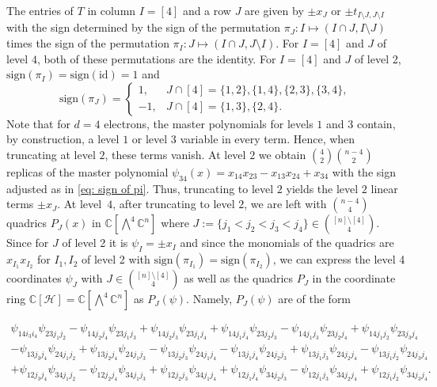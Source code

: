 \documentclass[11pt,reqno]{amsart}
\theoremstyle{definition}
\numberwithin{theorem}{section}
\newcommand{\sign}{\mathrm{sign}}
\numberwithin{equation}{section}
\begin{document}
The entries of $T$ in column $I=[4]$ and a row $J$ are given by $\pm x_J$ or $\pm t_{I \setminus J, J \setminus I}$ with the sign determined by
the sign of the permutation $\pi_J: I \mapsto (I \cap J, I \setminus J)$ times the sign of the permutation $\pi_I: J \mapsto (I \cap J, J \setminus I)$. 
For $I=[4]$ and $J$ of level $4$, both of these permutations are the identity.
For $I=[4]$ and $J$ of level 2, $\sign(\pi_I) = \sign (\text{id}) =1$ and 
\begin{equation}
\sign(\pi_J)= \left\{ \begin{array}{cl}
    1, & J \cap [4] = \{1,2\}, \{1,4\}, \{2,3\}, \{3,4\}, \\
    -1,  & J \cap [4] = \{1,3\}, \{2,4\}.
\end{array} \right.
\end{equation}\label{eq: sign of pi}
Note that for $d=4$ electrons, the master polynomials for levels $1$ and $3$ contain, by construction, a level $1$ or level $3$ variable in every term. Hence, when truncating at level $2$, these terms vanish. At level $2$ we obtain ${4 \choose 2}{n-4 \choose 2}$ replicas of the master polynomial 
$\psi_{34}(x) =  x_{14}x_{23} - x_{13}x_{24} + x_{34}$
with the sign adjusted as in \eqref{eq: sign of pi}. Thus, truncating to level $2$ yields the level $2$ linear terms $\pm x_J$.
At level~$4$, after truncating to level $2$, we are left with $n - 4 \choose 4$ quadrics $P_J(x)$ in $\mathbb C[\bigwedge^4\mathbb C^n]$
where $J:=\{j_1 < j_2 < j_3 < j_4\} \in \binom{[n] \setminus [4]}{4}$.
Since for $J$ of level 2 it is $\psi_I = \pm x_I$ and since the monomials of the quadrics are $x_{I_1}x_{I_2}$ for $I_1,I_2$ of level 2 with $\sign(\pi_{I_1}) = \sign (\pi_{I_2})$, we can express the level 4 coordinates $\psi_J$ with $J \in \binom{[n]\setminus [4]}{4}$ as well as the quadrics $P_J$ in the coordinate ring $\mathbb C[\mathcal{H}]=\mathbb C[\bigwedge^4\mathbb C^n]$ as $P_J(\psi)$. Namely, $P_J(\psi)$ are of the form
\begin{small}
\begin{equation}\label{eq:PJ}
\begin{gathered}
\psi_{14i_3i_4} \psi_{23 j_1 j_2} 
- \psi_{14 j_2 j_4}\psi_{23 j_1 j_3} 
+ \psi_{14 j_2 j_3}\psi_{23 j_1 j_4} 
+ \psi_{14 j_1 j_4}\psi_{23 j_2 j_3}
- \psi_{14 j_1 j_3}\psi_{23 j_2 j_4}
+ \psi_{14 j_1 j_2}\psi_{23 j_3 j_4} \\
- \psi_{13 j_3 j_4}\psi_{24 j_1 j_2}
+ \psi_{13 j_2 j_4}\psi_{24 j_1 j_3}
- \psi_{13 j_2 j_3}\psi_{24 j_1 j_4}
- \psi_{13 j_1 j_4}\psi_{24 j_2 j_3}
+ \psi_{13 j_1 j_3}\psi_{24 j_2 j_4}
- \psi_{13 j_1 j_2}\psi_{24 j_3 j_4} \\
+ \psi_{12 j_3 j_4}\psi_{34 j_1 j_2}
- \psi_{12 j_2 j_4}\psi_{34 j_1 j_3}
+ \psi_{12 j_2 j_3}\psi_{34 j_1 j_4}
+ \psi_{12 j_1 j_4}\psi_{34 j_2 j_3}
- \psi_{12 j_1 j_3}\psi_{34 j_2 j_4}
+ \psi_{12 j_1 j_2}\psi_{34 j_3 j_4}.
\end{gathered}
\end{equation}
\end{small}
\end{document}
